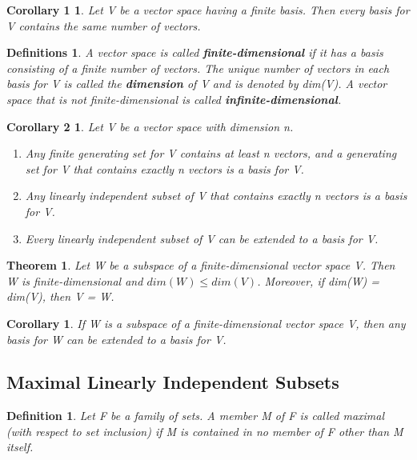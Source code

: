 \documentclass{article}
\newcommand{\bd}[1]{\textbf{#1}}
\theoremstyle{plain}
\newtheorem{theorem}{Theorem}[section]
\newtheorem*{corollary}{Corollary}
\newtheorem*{corollary1}{Corollary 1}
\newtheorem*{corollary2}{Corollary 2}
\newtheorem*{definition1}{Definition}
\newtheorem*{definitions}{Definitions}
\theoremstyle{plain} %
\begin{document}
\begin{corollary1}
Let V be a vector space having a finite basis. Then every basis for V contains the same number of vectors.
\end{corollary1}

\begin{definitions}
A vector space is called \bd{finite-dimensional} if it has a basis consisting of a finite number of vectors. The unique number of vectors in each basis for V is called the \bd{dimension} of V and is denoted by dim(V). A vector space that is not finite-dimensional is called \bd{infinite-dimensional}.
\end{definitions}

\begin{corollary2}
Let V be a vector space with dimension n.
\begin{enumerate}[label=(\alph*)]
\item Any finite generating set for V contains at least n vectors, and a generating set for V that contains exactly n vectors is a basis for V.
\item Any linearly independent subset of V that contains exactly n vectors is a basis for V.
\item Every linearly independent subset of V can be extended to a basis for V.
\end{enumerate}
\end{corollary2}

\begin{theorem}
Let W be a subspace of a finite-dimensional vector space V. Then W is finite-dimensional and $dim(W) \leq dim(V)$. Moreover, if dim(W) = dim(V), then V = W.
\end{theorem}

\begin{corollary}
If W is a subspace of a finite-dimensional vector space V, then any basis for W can be extended to a basis for V.
\end{corollary}

\subsection{Maximal Linearly Independent Subsets}

\begin{definition1}
Let F be a family of sets. A member M of F is called maximal (with respect to set inclusion) if M is contained in no member of F other than M itself.
\end{definition1}
\end{document}
